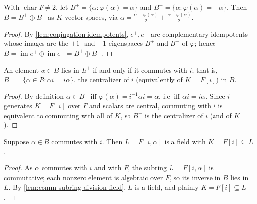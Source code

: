 \begin{lemma}
    \label{lem:eigenspace-decomp}
    With $\operatorname{char} F \neq 2$, let $B^{+} = \{\alpha : \varphi(\alpha)
    = \alpha\}$ and $B^{-} = \{\alpha : \varphi(\alpha) = -\alpha\}$. Then $B =
    B^{+} \oplus B^{-}$ as $K$-vector spaces, via $\alpha = \tfrac{\alpha +
    \varphi(\alpha)}{2} + \tfrac{\alpha - \varphi(\alpha)}{2}$.
\end{lemma}
\begin{proof}
    By \ref{lem:conjugation-idempotents}, $e^{+}, e^{-}$ are complementary
    idempotents whose images are the $+1$- and $-1$-eigenspaces $B^{+}$ and $B^{-}$
    of $\varphi$; hence $B = \operatorname{im} e^{+} \oplus \operatorname{im} e^{-}
    = B^{+} \oplus B^{-}$.
\end{proof}

\begin{lemma}
    \label{lem:Bplus-eq-centralizer}
    An element $\alpha \in B$ lies in $B^{+}$ if and only if it commutes with $i$;
    that is, $B^{+} = \{\alpha \in B : \alpha i = i\alpha\}$, the centralizer of $i$
    (equivalently of $K = F[i]$) in $B$.
\end{lemma}
\begin{proof}
    By definition $\alpha \in B^{+}$ iff $\varphi(\alpha) = i^{-1}\alpha i = \alpha$,
    i.e. iff $\alpha i = i\alpha$. Since $i$ generates $K = F[i]$ over $F$ and
    scalars are central, commuting with $i$ is equivalent to commuting with all of
    $K$, so $B^{+}$ is the centralizer of $i$ (and of $K$).
\end{proof}

\begin{lemma}
    \label{lem:commuting-subring-field}
    Suppose $\alpha \in B$ commutes with $i$. Then $L = F[i,\alpha]$ is a field with
    $K = F[i] \subseteq L$.
\end{lemma}
\begin{proof}
    As $\alpha$ commutes with $i$ and with $F$, the subring $L = F[i,\alpha]$ is
    commutative; each nonzero element is algebraic over $F$, so its inverse in $B$
    lies in $L$. By \ref{lem:comm-subring-division-field}, $L$ is a field, and
    plainly $K = F[i] \subseteq L$.
\end{proof}

